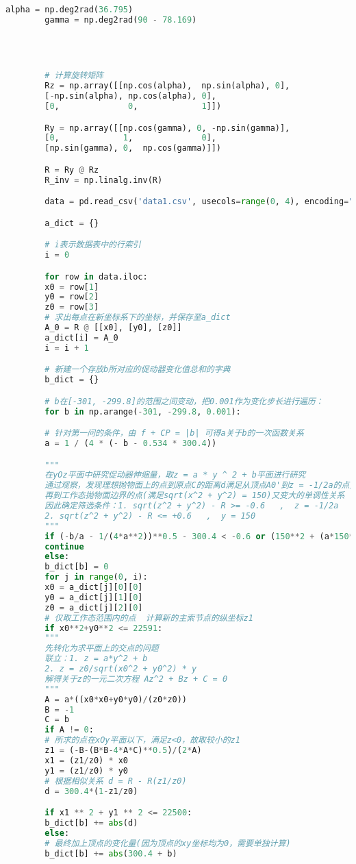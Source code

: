 \documentclass{myclass}
\begin{document}
\begin{appendices}
\begin{lstlisting}[language={python}]
		alpha = np.deg2rad(36.795)
		gamma = np.deg2rad(90 - 78.169)




		# 计算旋转矩阵
		Rz = np.array([[np.cos(alpha),  np.sin(alpha), 0],
		[-np.sin(alpha), np.cos(alpha), 0],
		[0,              0,             1]])

		Ry = np.array([[np.cos(gamma), 0, -np.sin(gamma)],
		[0,             1,              0],
		[np.sin(gamma), 0,  np.cos(gamma)]])

		R = Ry @ Rz
		R_inv = np.linalg.inv(R)

		data = pd.read_csv('data1.csv', usecols=range(0, 4), encoding="gbk")

		a_dict = {}

		# i表示数据表中的行索引
		i = 0

		for row in data.iloc:
		x0 = row[1]
		y0 = row[2]
		z0 = row[3]
		# 求出每点在新坐标系下的坐标，并保存至a_dict
		A_0 = R @ [[x0], [y0], [z0]]
		a_dict[i] = A_0
		i = i + 1

		# 新建一个存放b所对应的促动器变化值总和的字典
		b_dict = {}

		# b在[-301, -299.8]的范围之间变动，把0.001作为变化步长进行遍历：
		for b in np.arange(-301, -299.8, 0.001):

		# 针对第一问的条件，由 f + CP = |b| 可得a关于b的一次函数关系
		a = 1 / (4 * (- b - 0.534 * 300.4))

		"""
		在yOz平面中研究促动器伸缩量，取z = a * y ^ 2 + b平面进行研究
		通过观察，发现理想抛物面上的点到原点C的距离d满足从顶点A0'到z = -1/2a的点先变小，
		再到工作态抛物面边界的点(满足sqrt(x^2 + y^2) = 150)又变大的单调性关系
		因此确定筛选条件：1. sqrt(z^2 + y^2) - R >= -0.6   ,  z = -1/2a
		2. sqrt(z^2 + y^2) - R <= +0.6   ,  y = 150
		"""
		if (-b/a - 1/(4*a**2))**0.5 - 300.4 < -0.6 or (150**2 + (a*150**2+b)**2)**0.5 - 300.4 > 0.6:
		continue
		else:
		b_dict[b] = 0
		for j in range(0, i):
		x0 = a_dict[j][0][0]
		y0 = a_dict[j][1][0]
		z0 = a_dict[j][2][0]
		# 仅取工作态范围内的点  计算新的主索节点的纵坐标z1
		if x0**2+y0**2 <= 22591:
		"""
		先转化为求平面上的交点的问题
		联立：1. z = a*y^2 + b
		2. z = z0/sqrt(x0^2 + y0^2) * y
		解得关于z的一元二次方程 Az^2 + Bz + C = 0
		"""
		A = a*((x0*x0+y0*y0)/(z0*z0))
		B = -1
		C = b
		if A != 0:
		# 所求的点在xOy平面以下，满足z<0，故取较小的z1
		z1 = (-B-(B*B-4*A*C)**0.5)/(2*A)
		x1 = (z1/z0) * x0
		y1 = (z1/z0) * y0
		# 根据相似关系 d = R - R(z1/z0)
		d = 300.4*(1-z1/z0)

		if x1 ** 2 + y1 ** 2 <= 22500:
		b_dict[b] += abs(d)
		else:
		# 最终加上顶点的变化量(因为顶点的xy坐标均为0，需要单独计算)
		b_dict[b] += abs(300.4 + b)


\end{lstlisting}
\end{appendices}
\end{document}
